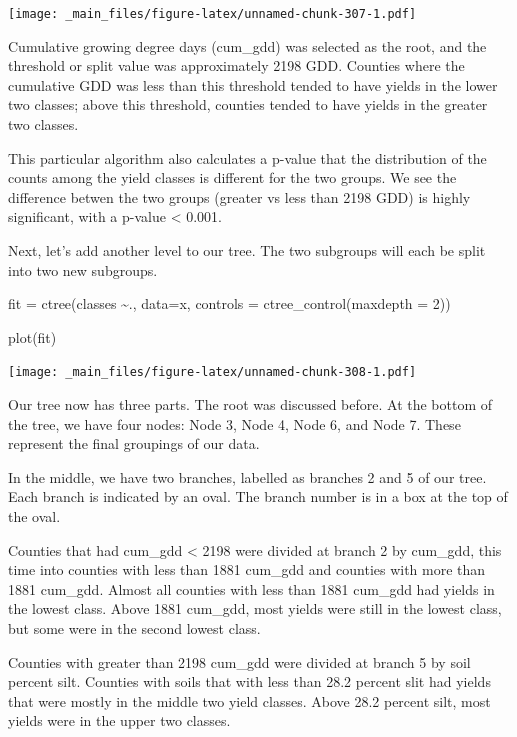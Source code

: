 \documentclass[
]{book}
\newenvironment{Shaded}{\begin{snugshade}}{\end{snugshade}}
\newcommand{\AttributeTok}[1]{\textcolor[rgb]{0.77,0.63,0.00}{#1}}
\newcommand{\DecValTok}[1]{\textcolor[rgb]{0.00,0.00,0.81}{#1}}
\newcommand{\FunctionTok}[1]{\textcolor[rgb]{0.00,0.00,0.00}{#1}}
\newcommand{\NormalTok}[1]{#1}
\newcommand{\OtherTok}[1]{\textcolor[rgb]{0.56,0.35,0.01}{#1}}
\newcommand{\SpecialCharTok}[1]{\textcolor[rgb]{0.00,0.00,0.00}{#1}}
\begin{document}
\texttt{[image: \_main\_files/figure-latex/unnamed-chunk-307-1.pdf]}

Cumulative growing degree days (cum\_gdd) was selected as the root, and the threshold or split value was approximately 2198 GDD. Counties where the cumulative GDD was less than this threshold tended to have yields in the lower two classes; above this threshold, counties tended to have yields in the greater two classes.

This particular algorithm also calculates a p-value that the distribution of the counts among the yield classes is different for the two groups. We see the difference betwen the two groups (greater vs less than 2198 GDD) is highly significant, with a p-value \textless{} 0.001.

Next, let's add another level to our tree. The two subgroups will each be split into two new subgroups.

\begin{Shaded}
\begin{Highlighting}[]
\NormalTok{fit }\OtherTok{=} \FunctionTok{ctree}\NormalTok{(classes }\SpecialCharTok{\textasciitilde{}}\NormalTok{., }\AttributeTok{data=}\NormalTok{x,}
            \AttributeTok{controls =} \FunctionTok{ctree\_control}\NormalTok{(}\AttributeTok{maxdepth =} \DecValTok{2}\NormalTok{))}

\FunctionTok{plot}\NormalTok{(fit)}
\end{Highlighting}
\end{Shaded}

\texttt{[image: \_main\_files/figure-latex/unnamed-chunk-308-1.pdf]}

Our tree now has three parts. The root was discussed before. At the bottom of the tree, we have four nodes: Node 3, Node 4, Node 6, and Node 7. These represent the final groupings of our data.

In the middle, we have two branches, labelled as branches 2 and 5 of our tree. Each branch is indicated by an oval. The branch number is in a box at the top of the oval.

Counties that had cum\_gdd \textless{} 2198 were divided at branch 2 by cum\_gdd, this time into counties with less than 1881 cum\_gdd and counties with more than 1881 cum\_gdd. Almost all counties with less than 1881 cum\_gdd had yields in the lowest class. Above 1881 cum\_gdd, most yields were still in the lowest class, but some were in the second lowest class.

Counties with greater than 2198 cum\_gdd were divided at branch 5 by soil percent silt. Counties with soils that with less than 28.2 percent slit had yields that were mostly in the middle two yield classes. Above 28.2 percent silt, most yields were in the upper two classes.
\end{document}

